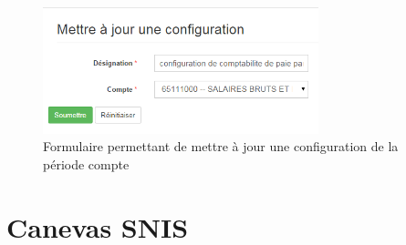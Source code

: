 \documentclass[12pt,a4paper]{report}
\begin{document}
\begin{figure}[h]
\begin{center}
\includegraphics[width=8cm]{pic/MettreAConfig.png}
\end{center}
\caption{Formulaire permettant de mettre à jour une configuration de la période compte}
\label{Formulaire permettant de mettre à jour une configuration de la période compte}
\end{figure} 


    
\chapter{Canevas SNIS}        



\tableofcontents
\end{document}
